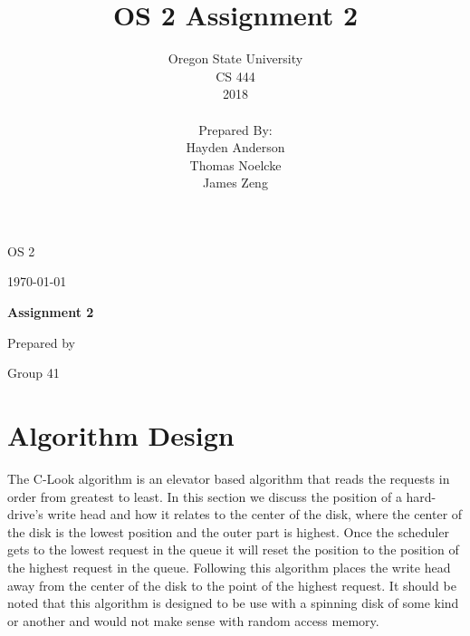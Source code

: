 \documentclass[draftclsnofoot, onecolumn, compsoc, 10pt]{IEEEtran}
\title{OS 2 Assignment 2}
\author{Oregon State University\\CS 444\\2018\\\\Prepared By:\\Hayden
Anderson\\Thomas Noelcke\\James Zeng\\}
\def \CapstoneTeamNumber{		41	}
\def \CapstoneProjectName{		Assignment 2 }
\begin{document}
\begin{titlepage}
    \begin{singlespace}
        \hfill
        \par\vspace{.2in}
        \centering
        \scshape{
            \huge OS 2 \par
            {\large\today}\par
            \vspace{1in}
            \textbf{\Huge\CapstoneProjectName}\par
            \vspace{1in}
            {\large Prepared by }\par
            Group\CapstoneTeamNumber\par
            \vspace{5pt}
            \vspace{20pt}
        }
        \vfill
    \end{singlespace}
\end{titlepage}
\newpage
{}
\clearpage
\tableofcontents
\pagebreak

\section{Algorithm Design}

    The C-Look algorithm is an elevator based algorithm that reads the requests in order from greatest to least. In this section we discuss the position of a hard-drive's write head and how it relates to the center of the disk, where the center of the disk is the lowest position and the outer part is highest. Once the scheduler gets to the lowest request in the queue it will reset the position to the position of the highest request in the queue. Following this algorithm places the write head away from the center of the disk to the point of the highest request. It should be noted that this algorithm is designed to be use with a spinning disk of some kind or another and would not make sense with random access memory.\\
\end{document}
